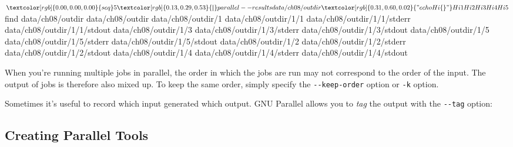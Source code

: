 \documentclass[
]{book}
\newenvironment{Shaded}{\begin{snugshade}}{\end{snugshade}}
\newcommand{\ExtensionTok}[1]{#1}
\newcommand{\FunctionTok}[1]{\textcolor[rgb]{0.00,0.00,0.00}{#1}}
\newcommand{\KeywordTok}[1]{\textcolor[rgb]{0.13,0.29,0.53}{\textbf{#1}}}
\newcommand{\NormalTok}[1]{#1}
\newcommand{\StringTok}[1]{\textcolor[rgb]{0.31,0.60,0.02}{#1}}
\theoremstyle{definition}
\theoremstyle{definition}
\theoremstyle{definition}
\theoremstyle{remark}
\begin{document}
\begin{Shaded}
\begin{Highlighting}[]
\NormalTok{$ }\FunctionTok{seq}\NormalTok{ 5 }\KeywordTok{|} \ExtensionTok{parallel}\NormalTok{ --results data/ch08/outdir }\StringTok{"echo Hi \{\}"}
\ExtensionTok{Hi}\NormalTok{ 1}
\ExtensionTok{Hi}\NormalTok{ 2}
\ExtensionTok{Hi}\NormalTok{ 3}
\ExtensionTok{Hi}\NormalTok{ 4}
\ExtensionTok{Hi}\NormalTok{ 5}
\NormalTok{$ }\FunctionTok{find}\NormalTok{ data/ch08/outdir}
\ExtensionTok{data/ch08/outdir}
\ExtensionTok{data/ch08/outdir/1}
\ExtensionTok{data/ch08/outdir/1/1}
\ExtensionTok{data/ch08/outdir/1/1/stderr}
\ExtensionTok{data/ch08/outdir/1/1/stdout}
\ExtensionTok{data/ch08/outdir/1/3}
\ExtensionTok{data/ch08/outdir/1/3/stderr}
\ExtensionTok{data/ch08/outdir/1/3/stdout}
\ExtensionTok{data/ch08/outdir/1/5}
\ExtensionTok{data/ch08/outdir/1/5/stderr}
\ExtensionTok{data/ch08/outdir/1/5/stdout}
\ExtensionTok{data/ch08/outdir/1/2}
\ExtensionTok{data/ch08/outdir/1/2/stderr}
\ExtensionTok{data/ch08/outdir/1/2/stdout}
\ExtensionTok{data/ch08/outdir/1/4}
\ExtensionTok{data/ch08/outdir/1/4/stderr}
\ExtensionTok{data/ch08/outdir/1/4/stdout}
\end{Highlighting}
\end{Shaded}

When you're running multiple jobs in parallel, the order in which the jobs are run may not correspond to the order of the input. The output of jobs is therefore also mixed up. To keep the same order, simply specify the \texttt{-\/-keep-order} option or \texttt{-k} option.

Sometimes it's useful to record which input generated which output. GNU Parallel allows you to \emph{tag} the output with the \texttt{-\/-tag} option:

\begin{Shaded}
\end{Shaded}

\hypertarget{creating-parallel-tools}{%
\subsection{Creating Parallel Tools}\label{creating-parallel-tools}}
\end{document}
